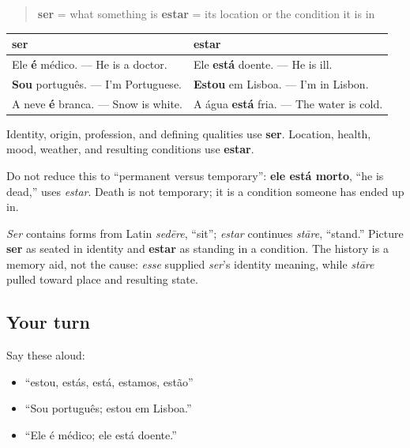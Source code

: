 \begin{grammarlens}[title={Grammar Lens: What something is; how it is}]
\begin{quote}
\textbf{ser} = what something is \textbf{estar} = its location or the condition it is in
\end{quote}

\noindent
\begin{tabularx}{\linewidth}{@{}>{\raggedright\arraybackslash}X>{\raggedright\arraybackslash}X@{}}
\toprule
\textbf{ser} & \textbf{estar} \\
\midrule
Ele \textbf{é} médico. — He is a doctor. & Ele \textbf{está} doente. — He is ill. \\
\textbf{Sou} português. — I’m Portuguese. & \textbf{Estou} em Lisboa. — I’m in Lisbon. \\
A neve \textbf{é} branca. — Snow is white. & A água \textbf{está} fria. — The water is cold. \\
\bottomrule
\end{tabularx}

Identity, origin, profession, and defining qualities use \textbf{ser}. Location, health, mood, weather, and resulting conditions use \textbf{estar}.

Do not reduce this to “permanent versus temporary”: \textbf{ele está morto}, “he is dead,” uses \emph{estar}. Death is not temporary; it is a condition someone has ended up in.
\end{grammarlens}

\begin{grammarlens}[title={What you've built: A mnemonic, not the cause}]
\emph{Ser} contains forms from Latin \emph{sedēre}, “sit”; \emph{estar} continues \emph{stāre}, “stand.” Picture \textbf{ser} as seated in identity and \textbf{estar} as standing in a condition. The history is a memory aid, not the cause: \emph{esse} supplied \emph{ser}’s identity meaning, while \emph{stāre} pulled toward place and resulting state.
\end{grammarlens}

\subsection*{Your turn}
Say these aloud:

\begin{itemize}
\raggedright
  \item “estou, estás, está, estamos, estão”
  \item “Sou português; estou em Lisboa.”
  \item “Ele é médico; ele está doente.”
\end{itemize}

